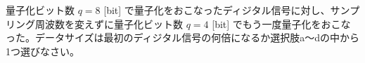 量子化ビット数 $q = 8$ [bit] で量子化をおこなったディジタル信号に対し、サンプリング周波数を変えずに量子化ビット数 $q = 4$ [bit] でもう一度量子化をおこなった。データサイズは最初のディジタル信号の何倍になるか選択肢a〜dの中から1つ選びなさい。
